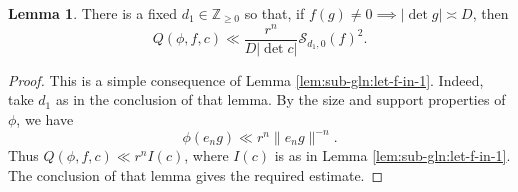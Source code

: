 \documentclass[reqno]{amsart}
\theoremstyle{plain} \newtheorem{theorem} {Theorem}
\theoremstyle{definition} \newtheorem{definition} [theorem] {Definition}
\theoremstyle{itplain} %
\newtheorem{lemma}[theorem]{Lemma}
\numberwithin{equation}{section}
\numberwithin{theorem}{section}
\renewcommand{\geq}{\geqslant}
\begin{document}
\begin{lemma}\label{lem:standard:there-fixed-d_1-1}
  There is a fixed $d_1 \in \mathbb{Z}_{\geq 0}$ so that, if $f(g) \neq 0 \implies |\det g| \asymp D$, then
  \begin{equation*}
    Q(\phi,f,c) \ll \frac{r^n}{D |\det c|} \mathcal{S}_{d_1,0}(f)^2.
  \end{equation*}
\end{lemma}
\begin{proof}
  This is a simple consequence of Lemma \ref{lem:sub-gln:let-f-in-1}.  Indeed, take $d_1$ as in the conclusion of that lemma.  By the size and support properties of $\phi$, we have
  \begin{equation*}
    \phi(e_n g) \ll r^n \|e_n g\|^{-n}.
\end{equation*}
  Thus $Q(\phi,f,c) \ll r^n I(c)$, where $I(c)$ is as in Lemma \ref{lem:sub-gln:let-f-in-1}.  The conclusion of that lemma gives the required estimate.
\end{proof}
\end{document}
